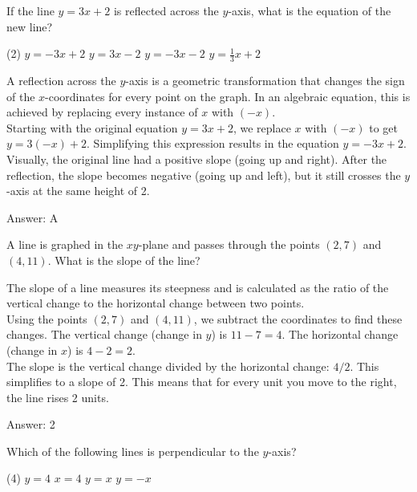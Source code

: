 \documentclass[11pt,paper=a4,answers]{exam}
\begin{document}
\begin{questions}
\question
If the line $y = 3x + 2$ is reflected across the $y$-axis, what is the equation of the new line?
\begin{tasks}(2)
    \task $y = -3x + 2$
    \task $y = 3x - 2$
    \task $y = -3x - 2$
    \task $y = \frac{1}{3}x + 2$
\end{tasks}

\begin{solution}
A reflection across the $y$-axis is a geometric transformation that changes the sign of the $x$-coordinates for every point on the graph. In an algebraic equation, this is achieved by replacing every instance of $x$ with $(-x)$.
\\[10pt]
Starting with the original equation $y = 3x + 2$, we replace $x$ with $(-x)$ to get $y = 3(-x) + 2$. Simplifying this expression results in the equation $y = -3x + 2$.
\\[10pt]
Visually, the original line had a positive slope (going up and right). After the reflection, the slope becomes negative (going up and left), but it still crosses the $y$-axis at the same height of 2.

\vspace{15pt}
Answer: \colorbox{yellow!100}{A}
\end{solution}

\question
A line is graphed in the $xy$-plane and passes through the points $(2, 7)$ and $(4, 11)$. What is the slope of the line?

\begin{solution}
The slope of a line measures its steepness and is calculated as the ratio of the vertical change to the horizontal change between two points. 
\\[10pt]
Using the points $(2, 7)$ and $(4, 11)$, we subtract the coordinates to find these changes. The vertical change (change in $y$) is $11 - 7 = 4$. The horizontal change (change in $x$) is $4 - 2 = 2$.
\\[10pt]
The slope is the vertical change divided by the horizontal change: $4 / 2$. This simplifies to a slope of 2. This means that for every unit you move to the right, the line rises 2 units.

\vspace{15pt}
Answer: \colorbox{yellow!100}{2}
\end{solution}

\question
Which of the following lines is perpendicular to the $y$-axis?
\begin{tasks}(4)
    \task $y = 4$
    \task $x = 4$
    \task $y = x$
    \task $y = -x$
\end{tasks}


\end{questions}
\end{document}
